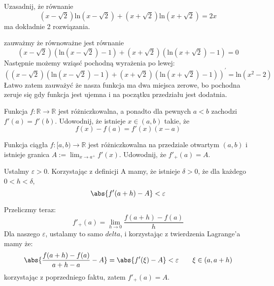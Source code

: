 \documentclass[12pt]{scrartcl}
\begin{document}
    \begin{zadanie}
        Uzasadnij, że równanie
        \[
            \left ( x - \sqrt{2}  \right ) \text{ln} \left ( x - \sqrt{2}  \right ) + \left ( x + \sqrt{2}  \right ) \text{ln} \left ( x + \sqrt{2}  \right ) = 2x
        \]
        ma dokładnie 2 rozwiązania.
    \end{zadanie}
    
    zauważmy że równoważne jest równanie
    \[
        \left ( x -\sqrt{2}  \right ) \left ( \text{ln} \left ( x - \sqrt{2}  \right ) - 1 \right ) + \left ( x+ \sqrt{2}  \right ) \left ( \text{ln} \left ( x + \sqrt{2}  \right ) - 1 \right ) = 0
    \]
    Następnie możemy wziąsć pochodną wyrażenia po lewej:
    \[
        \left ( \left ( x -\sqrt{2}  \right ) \left ( \text{ln} \left ( x - \sqrt{2}  \right ) - 1 \right ) + \left ( x+ \sqrt{2}  \right ) \left ( \text{ln} \left ( x + \sqrt{2}  \right ) - 1 \right ) \right )^{'} = \text{ln} \left ( x^2 - 2 \right ) 
    \]
    Łatwo zatem zauważyć że nasza funkcja ma dwa miejsca zerowe, bo pochodna zeruje się gdy funkcja jest ujemna i na początku przedziału jest dodatnia.

    \begin{zadanie}
        Funkcja $f: \mathbb{R} \to \mathbb{R} $ jest różniczkowalna, a ponadto dla pewnych $a < b$ zachodzi $f'(a) = f'(b)$. Udowodnij, że istnieje $x \in (a, b)$ takie, że
        \[
             f(x) - f(a) = f'(x)(x - a)
        \]
    \end{zadanie}

    \begin{zadanie}
        Funkcja ciągła $f: [a, b) \to \mathbb{R} $ jest różniczkowalna na przedziale otwartym $(a, b)$ i istnieje granica $A:= \lim_{x \to a^+} f'(x)$. Udowodnij, że $f'_+(a) = A$.
    \end{zadanie}
    
    Ustalmy $\varepsilon > 0$.
    Korzystając z definicji A mamy, że istnieje $\delta > 0$, że dla każdego $0 < h < \delta$,
    \[
        \abs{f'(a+h) - A} < \varepsilon 
    \]

    Przeliczmy teraz:
    \[
        f'_+(a) = \lim_{h \to 0} \frac{f(a+h) - f(a)}{h}   
    \]
    Dla naszego $\varepsilon$, ustalamy to samo $delta$, i korzystając z twierdzenia Lagrange'a mamy że:
    \[
        \abs{\frac{f(a + h) - f(a)}{a + h - a} - A} = \abs{f'( \xi) - A} < \varepsilon \qquad \xi \in (a,a+h)  
    \]
    korzystając z poprzedniego faktu, zatem $f'_+(a) = A$.
\end{document}
